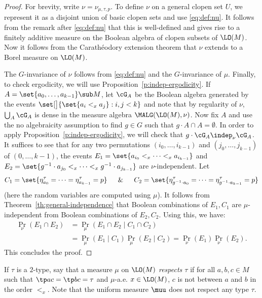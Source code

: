 \begin{proof}
For brevity, write $\nu = \nu_{\mu, \tau, p}$. To define $\nu$ on a general clopen set $U$, we represent it as a disjoint union of basic clopen sets and use \eqref{eq:def:nu}. It follows from the remark after \eqref{eq:def:nu} that this is well-defined and gives rise to a finitely additive measure on the Boolean algebra of clopen subsets of $\LO(M)$. Now it follows from the Carathéodory extension theorem that $\nu$ extends to a Borel measure on $\LO(M)$.

The $G$-invariance of $\nu$ follows from \eqref{eq:def:nu} and the $G$-invariance of $\mu$. Finally, to check ergodicity, we will use Proposition~\ref{p:indep-ergodicity}. If $A = \set{a_0, \ldots, a_{k-1}} \sub M$, let $\cG_A$ be the Boolean algebra generated by the events $\set[\big]{\set{a_i <_x a_j} : i, j < k}$ and note that by regularity of $\nu$, $\bigcup_A \cG_A$ is dense in the measure algebra $\MALG(\LO(M), \nu)$. Now fix $A$ and use the no algebraicity assumption to find $g \in G$ such that $g \cdot A \cap A = \emptyset$. In order to apply Proposition~\ref{p:indep-ergodicity}, we will check that $g \cdot \cG_A \indep_\nu \cG_A$. It suffices to see that for any two permutations $(i_0, \ldots, i_{k-1})$ and $(j_0, \ldots, j_{k-1})$ of $(0, \ldots, k-1)$, the events $E_1 = \set{a_{i_0} <_x \cdots <_x a_{i_{k-1}}}$ and $E_2 = \set{g^{-1} \cdot a_{j_0} <_x \cdots <_x g^{-1} \cdot a_{j_{k-1}}}$ are $\nu$-independent. Let\vspace*{-3pt}
\[
C_1 = \set{\eta_{a_0}^\tau = \cdots = \eta_{a_{k-1}}^\tau = p} \quad\And\quad C_2 = \set{\eta_{g^{-1} \cdot a_0}^\tau = \cdots = \eta_{g^{-1} \cdot a_{k-1}}^\tau = p}
\]
(here the random variables are computed using $\mu$). It follows from Theorem~\ref{th:general-independence} that Boolean combinations of $E_1, C_1$ are $\mu$-independent from Boolean combinations of $E_2, C_2$. Using this, we have:
\begin{equation*}
\begin{split}
\Pr_\nu(E_1 \cap E_2) &= \Pr_\mu(E_1 \cap E_2 \mid C_1 \cap C_2) \\
&= \Pr_\mu(E_1 \mid C_1) \Pr_\mu(E_2 \mid C_2) = \Pr_\nu(E_1) \Pr_\nu(E_2).
\end{split}
\end{equation*}
This concludes the proof.
\end{proof}

If $\tau$ is a $2$-type, say that a measure $\mu$ on $\LO(M)$ \emph{respects $\tau$} if for all $a, b, c \in M$ such that $\tp ac = \tp bc = \tau$ and $\mu$-a.e. $x \in \LO(M)$, $c$ is not between $a$ and $b$ in the order $<_x$. Note that the uniform measure $\muu$ does not respect any type $\tau$.

